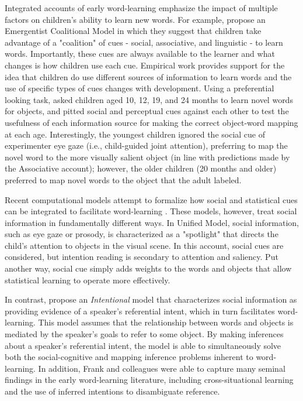 \documentclass[man]{apa2}
\begin{document}
Integrated accounts of early word-learning emphasize the impact of multiple factors on children's ability to learn new words. For example,  propose an Emergentist Coalitional Model in which they suggest that children take advantage of a "coalition" of cues - social, associative, and linguistic - to learn words. Importantly, these cues are always available to the learner and what changes is how children use each cue. Empirical work provides support for the idea that children do use different sources of information to learn words and the use of specific types of cues changes with development. Using a preferential looking task,  asked children aged 10, 12, 19, and 24 months to learn novel words for objects, and pitted social and perceptual cues against each other to test the usefulness of each information source for making the correct object-word mapping at each age. Interestingly, the youngest children ignored the social cue of experimenter eye gaze (i.e., child-guided joint attention), preferring to map the novel word to the more visually salient object (in line with predictions made by the Associative account);  however, the older children (20 months and older) preferred to map novel words to the object that the adult labeled. 

Recent computational models attempt to formalize how social and statistical cues can be integrated to facilitate word-learning \cite{yu2007unified,frank2009using}. These models, however, treat social information in fundamentally different ways. In  Unified Model, social information, such as eye gaze or prosody, is characterized as a "spotlight" that directs the child's attention to objects in the visual scene. In this account, social cues are considered, but intention reading is secondary to attention and saliency. Put another way, social cue simply adds weights to the words and objects that allow statistical learning to operate more effectively. 

In contrast, \cite{frank2009using} propose an \emph{Intentional} model that characterizes social information as providing evidence of a speaker's referential intent, which in turn facilitates word-learning. This model assumes that the relationship between words and objects is mediated by the speaker's goals to refer to some object. By making inferences about a speaker's referential intent, the model is able to simultaneously solve both the social-cognitive and mapping inference problems inherent to word-learning. In addition, Frank and colleagues were able to capture many seminal findings in the early word-learning literature, including cross-situational learning and the use of inferred intentions to disambiguate reference.
\end{document}
